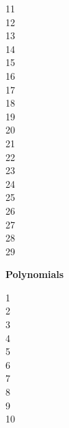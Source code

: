 11 \\


12 \\


13 \\


14 \\


15 \\


16 \\


17 \\


18 \\


19 \\


20 \\


21 \\


22 \\


23 \\


24 \\


25 \\


26 \\


27 \\


28 \\


29 \\


\newpage

\textbf{Polynomials}

1 \\


2 \\


3 \\


4 \\


5 \\


6 \\


7 \\


8 \\


9 \\


10 \\


